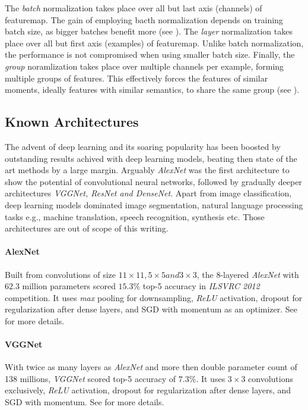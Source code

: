 The \emph{batch} normalization takes place over all but last axis (channels) of featuremap. The gain of employing bacth normalization depends on training batch size, as bigger batches benefit more (see \cite{DBLP:journals/corr/IoffeS15}). The \emph{layer} normalization takes place over all but first axis (examples) of featuremap. Unlike batch normalization, the performance is not compromised when using smaller batch size. Finally, the \emph{group} noramlization takes place over multiple channels per example, forming multiple groups of features. This effectively forces the features of similar moments, ideally features with similar semantics, to share the same group (see \cite{DBLP:journals/corr/abs-1803-08494}).

\subsection{Known Architectures}
The advent of deep learning and its soaring popularity has been boosted by outstanding results achived with deep learning models, beating then state of the art methods by a large margin. Arguably \textit{AlexNet} was the first architecture to show the potential of convolutional neural networks, followed by gradually deeper architectures \textit{VGGNet, ResNet and DenseNet}. Apart from image classification, deep learning models dominated image segmentation, natural language processing tasks e.g., machine translation, speech recognition, synthesis etc. Those architectures are out of scope of this writing.

\paragraph{AlexNet}
Built from convolutions of size $11 \times 11, 5 \times 5 and 3 \times 3$, the 8-layered \textit{AlexNet} with $62.3$ million parameters scored $15.3\%$ top-5 accuracy in \textit{ILSVRC 2012} competition. It uses \textit{max} pooling for downsampling, \textit{ReLU} activation, dropout for regularization after dense layers, and SGD with momentum as an optimizer. See \cite{alexnet} for more details.

\paragraph{VGGNet}
With twice as many layers as \textit{AlexNet} and more then double parameter count of 138 millions, \textit{VGGNet} scored top-5 accuracy of $7.3\%$. It uses $3 \times 3$ convolutions exclusively, \textit{ReLU} activation, dropout for regularization after dense layers, and SGD with momentum. See \cite{DBLP:journals/corr/SimonyanZ14a} for more details.

